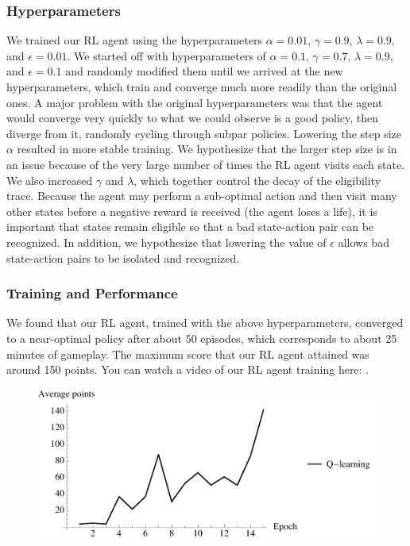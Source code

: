 \documentclass{article}
\begin{document}
\subsubsection{Hyperparameters}
We trained our RL agent using the hyperparameters $\alpha = 0.01$, $\gamma = 0.9$, $\lambda = 0.9$, and $\epsilon = 0.01$.  We started off with hyperparameters of $\alpha = 0.1$, $\gamma = 0.7$, $\lambda = 0.9$, and $\epsilon = 0.1$ and randomly modified them until we arrived at the new hyperparameters, which train and converge much more readily than the original ones.  A major problem with the original hyperparameters was that the agent would converge very quickly to what we could observe is a good policy, then diverge from it, randomly cycling through subpar policies.  Lowering the step size $\alpha$ resulted in more stable training.  We hypothesize that the larger step size is in an issue because of the very large number of times the RL agent visits each state.  We also increased $\gamma$ and $\lambda$, which together control the decay of the eligibility trace.  Because the agent may perform a sub-optimal action and then visit many other states before a negative reward is received (the agent loses a life), it is important that states remain eligible so that a bad state-action pair can be recognized.  In addition, we hypothesize that lowering the value of $\epsilon$ allows bad state-action pairs to be isolated and recognized.
\subsubsection{Training and Performance}
We found that our RL agent, trained with the above hyperparameters, converged to a near-optimal policy after about 50 episodes, which corresponds to about 25 minutes of gameplay.  The maximum score that our RL agent attained was around 150 points.  You can watch a video of our RL agent training here: .

  \begin{figure}[H]
    \centering
    \includegraphics[width=120mm]{ql_reward.pdf}
  \end{figure}
\end{document}
